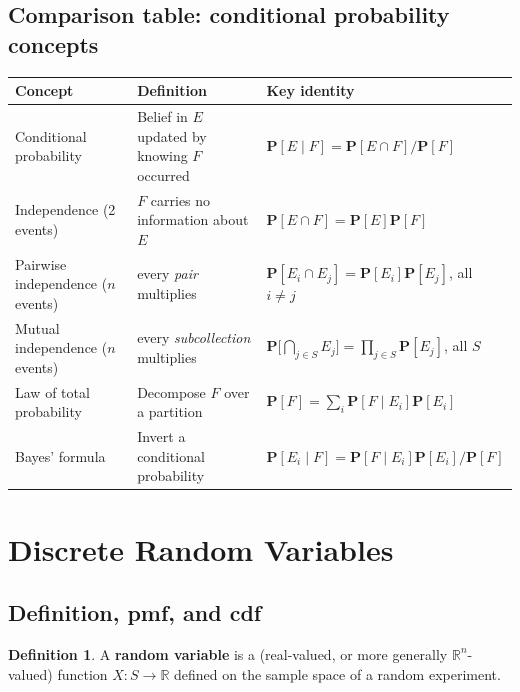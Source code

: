 \documentclass[11pt]{article}
\theoremstyle{definition}
\newtheorem{definition}{Definition}[section]
\theoremstyle{plain}
\theoremstyle{remark}
\newcommand{\R}{\mathbb{R}}
\begin{document}
\subsection{Comparison table: conditional probability concepts}

\begin{center}
\renewcommand{\arraystretch}{1.5}
\begin{longtable}{p{3.3cm} p{5.7cm} p{5.7cm}}
\toprule
\textbf{Concept} & \textbf{Definition} & \textbf{Key identity} \\
\midrule
Conditional probability & Belief in $E$ updated by knowing $F$ occurred & $\mathbf{P}[E\mid F]=\mathbf{P}[E\cap F]/\mathbf{P}[F]$ \\
Independence (2 events) & $F$ carries no information about $E$ & $\mathbf{P}[E\cap F]=\mathbf{P}[E]\mathbf{P}[F]$ \\
Pairwise independence ($n$ events) & every \emph{pair} multiplies & $\mathbf{P}[E_i\cap E_j]=\mathbf{P}[E_i]\mathbf{P}[E_j]$, all $i\ne j$ \\
Mutual independence ($n$ events) & every \emph{subcollection} multiplies & $\mathbf{P}\big[\bigcap_{j\in S}E_j\big]=\prod_{j\in S}\mathbf{P}[E_j]$, all $S$ \\
Law of total probability & Decompose $F$ over a partition & $\mathbf{P}[F]=\sum_i \mathbf{P}[F\mid E_i]\mathbf{P}[E_i]$ \\
Bayes' formula & Invert a conditional probability & $\mathbf{P}[E_i\mid F] = \mathbf{P}[F\mid E_i]\mathbf{P}[E_i]/\mathbf{P}[F]$ \\
\bottomrule
\end{longtable}
\end{center}

\newpage
\section{Discrete Random Variables}

\subsection{Definition, pmf, and cdf}

\begin{definition}
A \textbf{random variable} is a (real-valued, or more generally $\R^n$-valued) function
$X : S \to \R$ defined on the sample space of a random experiment.
\end{definition}
\end{document}
